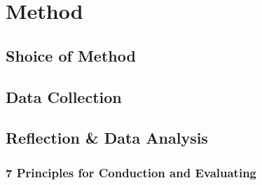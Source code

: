\chapter{Method}
\section{Shoice of Method}
\section{Data Collection}
\section{Reflection \& Data Analysis}
\subsection{7 Principles for Conduction and Evaluating}
